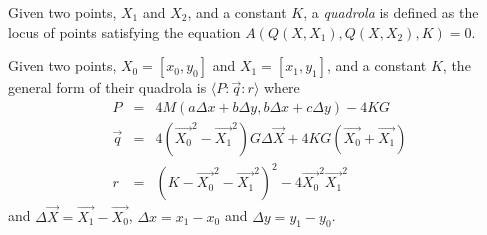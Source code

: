 \begin{definition}Given two points, $X_1$ and $X_2$, and a constant $K$, a \emph{quadrola} is defined as the locus of points satisfying the equation $A(Q(X, X_1), Q(X, X_2), K) = 0$. 
\end{definition}
\begin{theorem}  Given two points, $X_0 = [x_0, y_0]$ and $X_1 = [x_1, y_1]$, and a constant $K$, the general form of their quadrola is $\langle P\!:\!\vec{q}\!:\!r \rangle$ where
\begin{eqnarray}
P & = & 4M(a\Delta x + b\Delta y, b\Delta x + c\Delta y) - 4KG\\
\vec{q} & = & 4(\vec{X_0}^2 - \vec{X_1}^2)G\Delta \vec{X} + 4KG(\vec{X_0} + \vec{X_1})\\
r & = & \left(K - \vec{X_0}^2 - \vec{X_1}^2\right)^2 - 4\vec{X_0}^2\vec{X_1}^2
\end{eqnarray}
and $\Delta \vec{X} = \vec{X_1} - \vec{X_0}$, $\Delta x = x_1 - x_0$ and $\Delta y = y_1 - y_0$.
\end{theorem}
